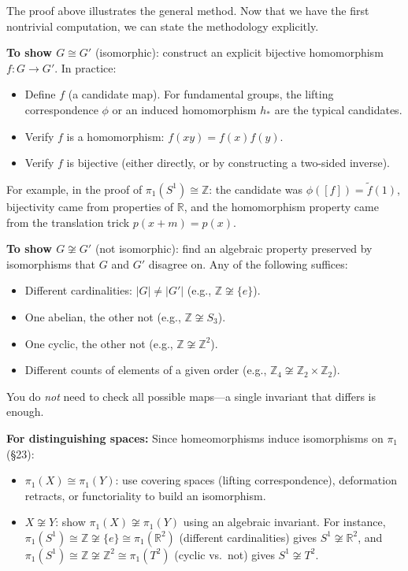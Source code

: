 \documentclass[11pt]{report}
\begin{document}
\begin{rembox}
The proof above illustrates the general method. Now that we have the first nontrivial computation, we can state the methodology explicitly.

\textbf{To show $G \cong G'$} (isomorphic): construct an explicit bijective homomorphism $f: G \to G'$. In practice:
\begin{itemize}[nosep]
    \item Define $f$ (a candidate map). For fundamental groups, the lifting correspondence $\phi$ or an induced homomorphism $h_*$ are the typical candidates.
    \item Verify $f$ is a homomorphism: $f(xy) = f(x)f(y)$.
    \item Verify $f$ is bijective (either directly, or by constructing a two-sided inverse).
\end{itemize}
For example, in the proof of $\pi_1(S^1) \cong \mathbb{Z}$: the candidate was $\phi([f]) = \tilde{f}(1)$, bijectivity came from properties of $\mathbb{R}$, and the homomorphism property came from the translation trick $p(x + m) = p(x)$.

\textbf{To show $G \not\cong G'$} (not isomorphic): find an algebraic property preserved by isomorphisms that $G$ and $G'$ disagree on. Any of the following suffices:
\begin{itemize}[nosep]
    \item Different cardinalities: $|G| \neq |G'|$ (e.g., $\mathbb{Z} \not\cong \{e\}$).
    \item One abelian, the other not (e.g., $\mathbb{Z} \not\cong S_3$).
    \item One cyclic, the other not (e.g., $\mathbb{Z} \not\cong \mathbb{Z}^2$).
    \item Different counts of elements of a given order (e.g., $\mathbb{Z}_4 \not\cong \mathbb{Z}_2 \times \mathbb{Z}_2$).
\end{itemize}
You do \emph{not} need to check all possible maps---a single invariant that differs is enough.

\textbf{For distinguishing spaces:} Since homeomorphisms induce isomorphisms on $\pi_1$ (\S 23):
\begin{itemize}[nosep]
    \item $\pi_1(X) \cong \pi_1(Y)$: use covering spaces (lifting correspondence), deformation retracts, or functoriality to build an isomorphism.
    \item $X \not\cong Y$: show $\pi_1(X) \not\cong \pi_1(Y)$ using an algebraic invariant. For instance, $\pi_1(S^1) \cong \mathbb{Z} \not\cong \{e\} \cong \pi_1(\mathbb{R}^2)$ (different cardinalities) gives $S^1 \not\cong \mathbb{R}^2$, and $\pi_1(S^1) \cong \mathbb{Z} \not\cong \mathbb{Z}^2 \cong \pi_1(T^2)$ (cyclic vs.\ not) gives $S^1 \not\cong T^2$.
\end{itemize}
\end{rembox}
\end{document}
